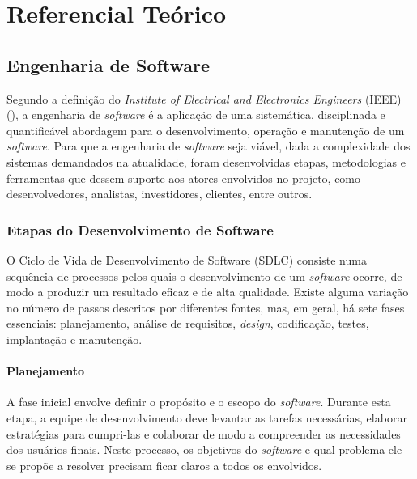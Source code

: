 

\chapter{Referencial Teórico}\label{cap:fundamentacao}

\section{Engenharia de Software}
Segundo a definição do \emph{Institute of Electrical and Electronics Engineers} (IEEE) (\citeyear{159342}), a engenharia de \emph{software} é a aplicação de uma sistemática, disciplinada e quantificável abordagem para o desenvolvimento, operação e manutenção de um \emph{software}. Para que a engenharia de \emph{software} seja viável, dada a complexidade dos sistemas demandados na atualidade, foram desenvolvidas etapas, metodologias e ferramentas que dessem suporte aos atores envolvidos no projeto, como desenvolvedores, analistas, investidores, clientes, entre outros.

\subsection{Etapas do Desenvolvimento de Software}
O Ciclo de Vida de Desenvolvimento de Software (SDLC) consiste numa sequência de processos pelos quais o desenvolvimento de um \emph{software} ocorre, de modo a produzir um resultado eficaz e de alta qualidade. Existe alguma variação no número de passos descritos por diferentes fontes, mas, em geral, há sete fases essenciais: planejamento, análise de requisitos, \emph{design}, codificação, testes, implantação e manutenção.

\subsubsection{Planejamento}

A fase inicial envolve definir o propósito e o escopo do \emph{software}. Durante esta etapa, a equipe de desenvolvimento deve levantar as tarefas necessárias, elaborar estratégias para cumpri-las e colaborar de modo a compreender as necessidades dos usuários finais. Neste processo, os objetivos do \emph{software} e qual problema ele se propõe a resolver precisam ficar claros a todos os envolvidos.

